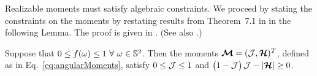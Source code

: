 Realizable moments must satisfy algebraic constraints.  
We proceed by stating the constraints on the moments by restating results from Theorem~7.1 in \cite{banachLarecki_2017a} in the following Lemma.  
The proof is given in \cite{banachLarecki_2017a}.  
(See also \cite{lareckiBanach_2011,banachLarecki_2013}.)
\begin{lemma}
  Suppose that $0\le f(\omega) \le1~\forall~\omega\in\mathbb{S}^{2}$.  
  Then the moments $\boldsymbol{\mathcal{M}}=(\mathcal{J},\boldsymbol{\mathcal{H}})^{T}$, defined as in Eq.~\eqref{eq:angularMoments}, satisfy $0\le\mathcal{J}\le1$ and $\big(1-\mathcal{J}\big)\,\mathcal{J}-|\boldsymbol{\mathcal{H}}|\ge0$. 
  \label{lem:MomentRealizable} 
\end{lemma}

